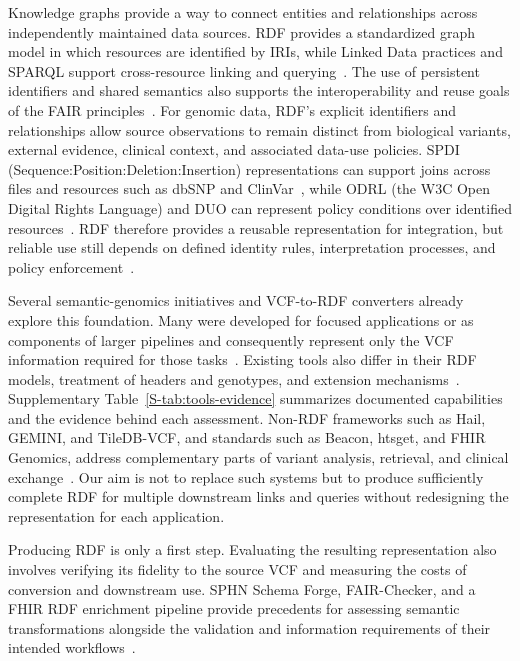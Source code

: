 \documentclass[pdflatex,sn-mathphys-num]{sn-jnl}
\begin{document}
Knowledge graphs provide a way to connect entities and relationships across independently maintained data sources.
RDF provides a standardized graph model in which resources are identified by IRIs, while Linked Data practices and SPARQL support cross-resource linking and querying~\cite{rdf,hogan_knowledge_graphs_2021,W3CLinkedDataWiki,sparqllang}.
The use of persistent identifiers and shared semantics also supports the interoperability and reuse goals of the FAIR principles~\cite{wilkinson2016fair}.
For genomic data, RDF's explicit identifiers and relationships allow source observations to remain distinct from biological variants, external evidence, clinical context, and associated data-use policies.
SPDI (Sequence:Position:Deletion:Insertion) representations can support joins across files and resources such as dbSNP and ClinVar~\cite{holmes2020spdi,sherry2001dbsnp,landrum2018clinvar}, while ODRL (the W3C Open Digital Rights Language) and DUO can represent policy conditions over identified resources~\cite{odrl_2018,lawson2021duo}.
RDF therefore provides a reusable representation for integration, but reliable use still depends on defined identity rules, interpretation processes, and policy enforcement~\cite{odrl_2018,xacml3_2013}.

Several semantic-genomics initiatives and VCF-to-RDF converters already explore this foundation.
Many were developed for focused applications or as components of larger pipelines and consequently represent only the VCF information required for those tasks~\cite{katayama2019biohackathon,JVarkit_2015,bio_vcf,togovar_2022,semantic_beac_2025}.
Existing tools also differ in their RDF models, treatment of headers and genotypes, and extension mechanisms~\cite{togovar_2022,JVarkit_2015,sparqling_genomics_2020,sparqling_genomics_software,baran2015gfvo}.
Supplementary Table~\ref{S-tab:tools-evidence} summarizes documented capabilities and the evidence behind each assessment.
Non-RDF frameworks such as Hail, GEMINI, and TileDB-VCF, and standards such as Beacon, htsget, and FHIR Genomics, address complementary parts of variant analysis, retrieval, and clinical exchange~\cite{hail_software,paila2013gemini,tiledb_vcf_software,rambla2022beacon,kelleher2019htsget,fhir_genomics_ig}.
Our aim is not to replace such systems but to produce sufficiently complete RDF for multiple downstream links and queries without redesigning the representation for each application.

Producing RDF is only a first step.
Evaluating the resulting representation also involves verifying its fidelity to the source VCF and measuring the costs of conversion and downstream use.
SPHN Schema Forge, FAIR-Checker, and a FHIR RDF enrichment pipeline provide precedents for assessing semantic transformations alongside the validation and information requirements of their intended workflows~\cite{toure2025forge,gaignard2023fairchecker,ansari2025etl}.
\end{document}
